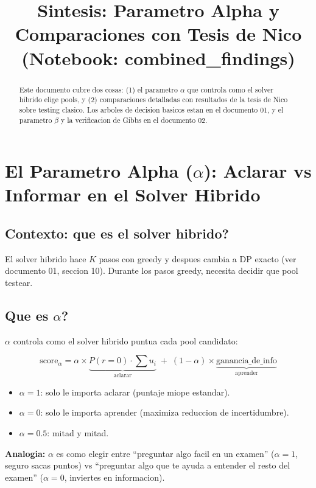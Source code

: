 \documentclass[11pt]{article}
\title{Sintesis: Parametro Alpha y Comparaciones con Tesis de Nico\\
\large (Notebook: combined\_findings)}
\author{}
\date{}
\begin{document}
\maketitle

\begin{abstract}
Este documento cubre dos cosas:
(1) el parametro $\alpha$ que controla como el solver hibrido
elige pools, y
(2) comparaciones detalladas con resultados de la tesis de Nico
sobre testing clasico.
Los arboles de decision basicos estan en el documento 01,
y el parametro $\beta$ y la verificacion de Gibbs en el documento 02.
\end{abstract}

\section{El Parametro Alpha ($\alpha$): Aclarar vs Informar en el Solver Hibrido}

\subsection{Contexto: que es el solver hibrido?}

El solver hibrido hace $K$ pasos con greedy y despues cambia a DP exacto
(ver documento 01, seccion 10).
Durante los pasos greedy, necesita decidir que pool testear.

\subsection{Que es $\alpha$?}

$\alpha$ controla como el solver hibrido puntua cada pool candidato:

$$\text{score}_\alpha = \alpha \times \underbrace{P(r=0) \cdot \sum u_i}_{\text{aclarar}} \;+\; (1 - \alpha) \times \underbrace{\text{ganancia\_de\_info}}_{\text{aprender}}$$

\begin{itemize}
  \item $\alpha = 1$: solo le importa aclarar (puntaje miope estandar).
  \item $\alpha = 0$: solo le importa aprender (maximiza reduccion de incertidumbre).
  \item $\alpha = 0.5$: mitad y mitad.
\end{itemize}

\textbf{Analogia:} $\alpha$ es como elegir entre ``preguntar algo facil en un examen''
($\alpha = 1$, seguro sacas puntos) vs ``preguntar algo que te ayuda a entender
el resto del examen'' ($\alpha = 0$, inviertes en informacion).
\end{document}
